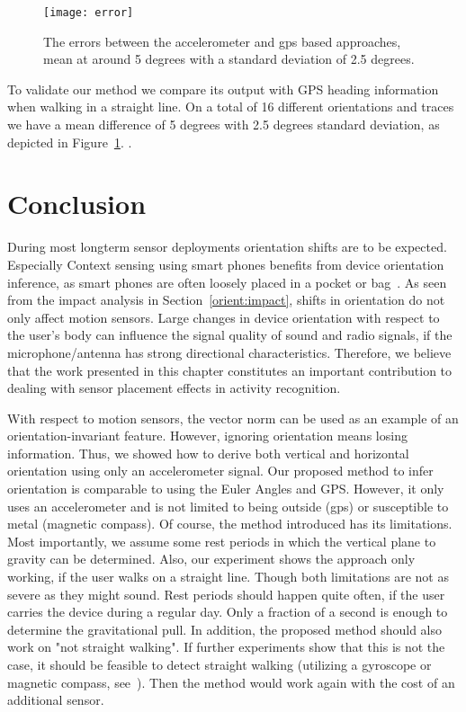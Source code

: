 \begin{figure}[!t]
\centering
\texttt{[image: error]}

\caption[Error between accelerometer and gps]{The errors between the accelerometer and gps based approaches, mean at around 5 degrees 
with a standard deviation of 2.5 degrees.}
\label{box_plot}
\end{figure}

To validate our method we compare its output with GPS heading
information when walking in a straight line. On a total of 16
different orientations and traces we have a mean difference of 5
degrees with 2.5 degrees standard deviation, as depicted in
Figure~\ref{box_plot}. .

\section{Conclusion}
During most longterm sensor deployments orientation shifts are to be expected. Especially Context sensing using smart phones benefits
from device orientation inference, as smart phones are often loosely placed in a pocket or bag~\cite{Ichikawa:2005p6295}.
As seen from the impact analysis in Section~\ref{orient:impact}, shifts in orientation do not only affect motion sensors. Large changes in device orientation with respect to the user's body can influence the signal quality of sound and radio signals, if the microphone/antenna has strong directional characteristics. 
Therefore, we believe that the work presented in this chapter constitutes an important contribution to dealing with sensor placement effects in activity recognition.

With respect to motion sensors, the vector norm can be used as an example of an orientation-invariant feature. However, ignoring orientation means losing information. Thus, we showed how to derive both vertical and horizontal orientation using only an
accelerometer signal. Our proposed method to infer orientation is comparable to using the
Euler Angles and GPS. However, it only uses an accelerometer and is not limited to being outside (gps) or susceptible to metal (magnetic compass).
Of course, the method introduced has its limitations. Most importantly, we assume some rest periods in which the vertical plane to gravity can be determined.
Also, our experiment shows the approach only working, if the user walks on a straight line. Though both limitations are not as severe as they might sound.
Rest periods should happen quite often, if the user carries the device during a regular day. Only a fraction of a second is enough to determine the 
gravitational pull. In addition, the proposed method should also work on "not straight walking". If further experiments show that this is not the case, 
it should be feasible to detect straight walking (utilizing a gyroscope or magnetic compass, see~\cite{sekine2000}). Then the method would work again with the cost of an additional sensor. 


